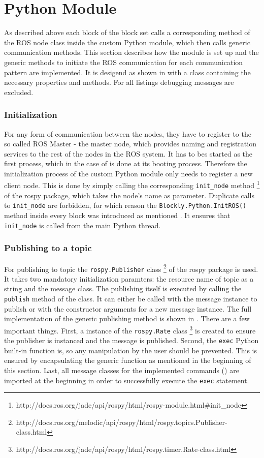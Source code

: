 \section{Python Module} \label{sec:PythonModule}
As described above each block of the \hobbit{} block set calls a corresponding method of the ROS node class inside the custom Python module, which then calls generic communication methods. This section describes how the module is set up and the generic methods to initiate the ROS communication for each communication pattern are implemented. It is desigend as shown in  with a class containing the necessary properties and methods. For all listings debugging messages are excluded.

\subsubsection{Initialization}
For any form of communication between the nodes, they have to register to the so called ROS Master - the master node, which provides naming and registration services to the rest of the nodes in the ROS system. It has to bes started as the first process, which in the case of \hobbit{} is done at its booting process. Therefore the initialization process of the custom Python module only needs to register a new client node. This is done by simply calling the corresponding \lstinline!init_node! method \footnote{http://docs.ros.org/jade/api/rospy/html/rospy-module.html#init\_node} of the rospy package, which takes the node's name as parameter. Duplicate calls to \lstinline!init_node! are forbidden, for which reason the \lstinline!Blockly.Python.InitROS()! method inside every block was introduced as mentioned . It ensures that \lstinline!init_node! is called from the main Python thread.

\subsubsection{Publishing to a topic}
For publishing to topic the \lstinline!rospy.Publisher! class \footnote{http://docs.ros.org/melodic/api/rospy/html/rospy.topics.Publisher-class.html} of the rospy package is used. It takes two mandatory initialization paramters: the resource name of topic as a string and the message class. The publishing itself is executed by calling the \lstinline!publish! method of the class. It can either be called with the message instance to publish or with the constructor arguments for a new message instance. The full implementation of the generic publishing method is shown in . There are a few important things. First, a instance of the \lstinline!rospy.Rate! class \footnote{http://docs.ros.org/jade/api/rospy/html/rospy.timer.Rate-class.html} is created to ensure the publisher is instanced and the message is published. Second, the \lstinline!exec! Python built-in function is, so any manipulation by the user should be prevented. This is ensured by encapsulating the generic function as mentioned in the beginning of this section. Last, all message classes for the implemented commands () are imported at the beginning in order to successfully execute the \lstinline!exec! statement.

